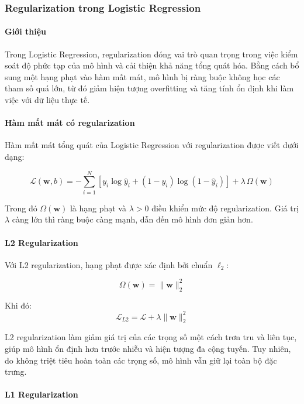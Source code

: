 \subsubsection{Regularization trong Logistic Regression}

\paragraph{Giới thiệu}

Trong Logistic Regression, regularization đóng vai trò quan trọng trong việc kiểm soát độ phức tạp của mô hình và cải thiện khả năng tổng quát hóa. Bằng cách bổ sung một hạng phạt vào hàm mất mát, mô hình bị ràng buộc không học các tham số quá lớn, từ đó giảm hiện tượng overfitting và tăng tính ổn định khi làm việc với dữ liệu thực tế.

\paragraph{Hàm mất mát có regularization}

Hàm mất mát tổng quát của Logistic Regression với regularization được viết dưới dạng:

\[
\mathcal{L}(\boldsymbol{w}, b) =
- \sum_{i=1}^{N}
\left[
y_i \log \hat{y}_i + (1 - y_i) \log (1 - \hat{y}_i)
\right]
+ \lambda \, \Omega(\boldsymbol{w})
\]

Trong đó $\Omega(\boldsymbol{w})$ là hạng phạt và $\lambda > 0$ điều khiển mức độ regularization. Giá trị $\lambda$ càng lớn thì ràng buộc càng mạnh, dẫn đến mô hình đơn giản hơn.

\paragraph{L2 Regularization}

Với L2 regularization, hạng phạt được xác định bởi chuẩn $\ell_2$:

\[
\Omega(\boldsymbol{w}) = \|\boldsymbol{w}\|_2^2
\]

Khi đó:
\[
\mathcal{L}_{L2} =
\mathcal{L} + \lambda \|\boldsymbol{w}\|_2^2
\]

L2 regularization làm giảm giá trị của các trọng số một cách trơn tru và liên tục, giúp mô hình ổn định hơn trước nhiễu và hiện tượng đa cộng tuyến. Tuy nhiên, do không triệt tiêu hoàn toàn các trọng số, mô hình vẫn giữ lại toàn bộ đặc trưng.

\paragraph{L1 Regularization}

